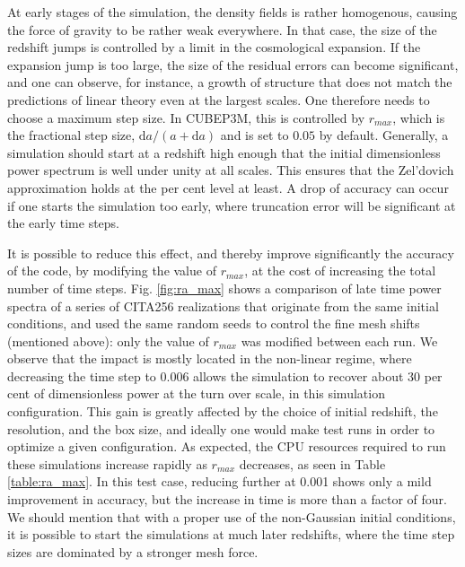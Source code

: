 At early stages of the simulation, the density fields is rather homogenous, causing the force of gravity to be
rather weak everywhere. In that case, the size of the redshift jumps is controlled by a limit in the cosmological expansion.
If the expansion jump is too large, the size of the residual errors can become significant, and one can observe, for instance,
a growth of structure that does not match the predictions of  linear theory even at the largest scales.
One therefore needs to choose a maximum step size. In {\small CUBEP3M}, this is controlled by $r_{max}$, which is the fractional step size,
$\mbox{d}a/(a + \mbox{d}a)$ and is set to $0.05$ by default.  Generally, a simulation should start at a redshift high enough that
the initial dimensionless power spectrum is well under unity at all scales. This ensures that the Zel'dovich approximation
 holds at the per cent level at least. A drop of accuracy can occur if one starts the simulation too early, where
 truncation error will be significant at the early time steps.


It is possible to reduce this effect, and thereby improve significantly 
the accuracy of the code, by modifying the value of $r_{max}$, at the cost of increasing the total number of time steps.
Fig. \ref{fig:ra_max} shows a comparison of late time power spectra of a series of CITA256 realizations that originate from the same initial conditions, 
and used the same random seeds to control the fine mesh shifts (mentioned above): only the value of $r_{max}$ was modified between each run. 
We observe that the impact is mostly located in the non-linear regime, where decreasing the time step to 0.006 
allows the simulation to recover about 30 per cent of dimensionless power at the turn over scale, in this simulation configuration.
This gain is greatly affected by the choice of initial redshift, the resolution, and the box size, and ideally one would make
test runs in order to optimize a given configuration.  
As expected, the {\small CPU} resources required to run these simulations increase rapidly as $r_{max}$ decreases, as seen in Table \ref{table:ra_max}. 
In this test case, reducing further at 0.001 shows only a mild improvement in accuracy, but the increase in time is more than a factor of four.
We should mention that with a proper use of the non-Gaussian initial conditions, it is possible to start the simulations at much later redshifts, where the time step sizes are dominated by a stronger mesh force.
 

